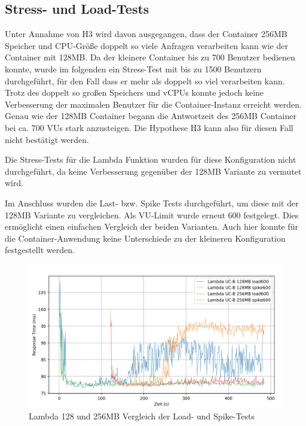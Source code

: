 \subsection{Stress- und Load-Tests}
Unter Annahme von H3 wird davon ausgegangen, dass der Container 256MB Speicher und CPU-Größe doppelt so viele Anfragen verarbeiten kann wie der Container mit 128MB. Da der kleinere Container bis zu 700 Benutzer bedienen konnte, wurde im folgenden ein Stress-Test mit bis zu 1500 Benutzern durchgeführt, für den Fall dass er mehr als doppelt so viel verarbeiten kann.
Trotz des doppelt so großen Speichers und vCPUs konnte jedoch keine Verbesserung der maximalen Benutzer für die Container-Instanz erreicht werden. Genau wie der 128MB Container begann die Antwortzeit des 256MB Container bei ca. 700 VUs stark anzusteigen. Die Hypothese H3 kann also für diesen Fall nicht bestätigt werden.

Die Stress-Tests für die Lambda Funktion wurden für diese Konfiguration nicht durchgeführt, da keine Verbesserung gegenüber der 128MB Variante zu vermutet wird. 

Im Anschluss wurden die Last- bzw. Spike Tests durchgeführt, um diese mit der 128MB Variante zu vergleichen. Als VU-Limit wurde erneut 600 festgelegt. Dies ermöglicht einen einfachen Vergleich der beiden Varianten.
Auch hier konnte für die Container-Anwendung keine Unterschiede zu der kleineren Konfiguration festgestellt werden. 

\begin{figure}[H]
    \includegraphics[width=\textwidth]{img/lambda128+256-ucb-load600-vs-spike600-graph.png}
    \caption[Lambda 128MB und 256MB Vergleich der Load- und Spike-Tests]{Lambda 128 und 256MB Vergleich der Load- und Spike-Tests}
    \label{fig:lambda128+256-ucb-load600-vs-spike600-graph}
\end{figure}

